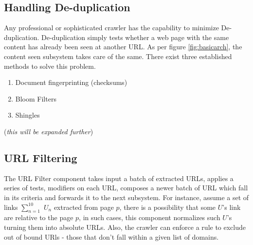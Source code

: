 \subsection{Handling De-duplication}
Any professional or sophisticated crawler has the capability to minimize De-duplication. De-duplication
simply tests whether a web page with the same content has already been seen at another URL. As per
figure \ref{fig:basicarch}, the content seen subsystem takes care of the same. There exist three
established methods to solve this problem. 

\begin{enumerate}
  \item Document fingerprinting (checksums)
  \item Bloom Filters
  \item Shingles
\end{enumerate}

(\textit{this will be expanded further})

\pagebreak

\subsection{URL Filtering}\label{urlfilter}
The URL Filter component takes input a batch of extracted URLs, applies a series of tests, modifiers on each URL, composes a newer batch of URL which fall in its
criteria and forwards it to the next subsystem. For instance, assume a set of links $\sum_{n=1}^{10}$ $ U_n$ extracted from page $p$, there is a possibility that some $U$'s link are relative to the page $p$, in
such cases, this component normalizes such $U$'s turning them into absolute URLs. Also, the crawler can
enforce a rule to exclude out of bound URls - those that don't fall within a given list of domains. 

